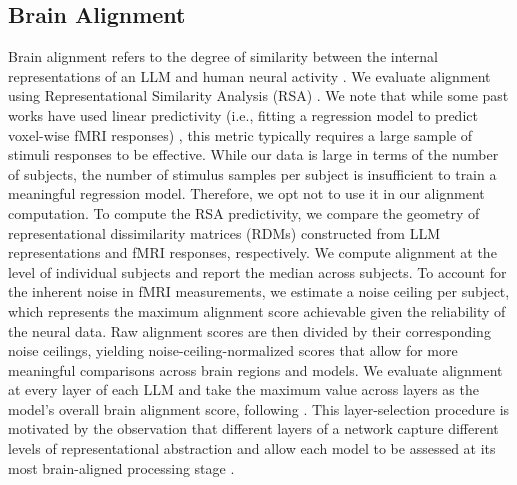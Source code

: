 \subsection{Brain Alignment}
Brain alignment refers to the degree of similarity between the internal representations of an LLM and human neural activity \citep{schrimpf2018brain}. We evaluate alignment using Representational Similarity Analysis (RSA) \citep{kriegeskorte2008representational}. We note that while some past works have used linear predictivity (i.e., fitting a regression model to predict voxel-wise fMRI responses) \citep{schrimpf2018brain,schrimpf2021neural}, this metric typically requires a large sample of stimuli responses to be effective. While our data is large in terms of the number of subjects, the number of stimulus samples per subject is insufficient to train a meaningful regression model. Therefore, we opt not to use it in our alignment computation. 
To compute the RSA predictivity, we compare the geometry of representational dissimilarity matrices (RDMs) constructed from LLM representations and fMRI responses, respectively. We compute alignment at the level of individual subjects and report the median across subjects. To account for the inherent noise in fMRI measurements, we estimate a noise ceiling per subject, which represents the maximum alignment score achievable given the reliability of the neural data. Raw alignment scores are then divided by their corresponding noise ceilings, yielding noise-ceiling-normalized scores that allow for more meaningful comparisons across brain regions and models. We evaluate alignment at every layer of each LLM and take the maximum value across layers as the model's overall brain alignment score, following \citet{schrimpf2018brain}. This layer-selection procedure is motivated by the observation that different layers of a network capture different levels of representational abstraction and allow each model to be assessed at its most brain-aligned processing stage \citep{elhage2021mathematical, tenney2019bert, jawahar-etal-2019-bert}.

